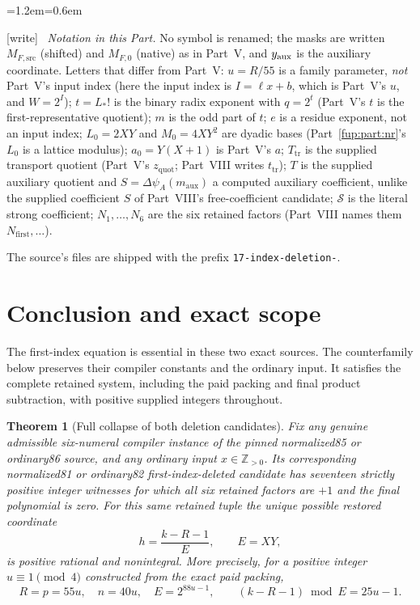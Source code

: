 \documentclass[11pt,letterpaper]{article}
\newtheorem{theorem}{Theorem}[section]
\theoremstyle{definition}\newtheorem{definition}[theorem]{Definition}
\theoremstyle{remark}\newtheorem{remark}[theorem]{Remark}
\newcommand{\Z}{\mathbb Z}\newcommand{\Np}{\mathbb Z_{>0}}
\newcommand{\MFsrcV}{M_{F,\mathrm{src}}}
\newcommand{\MFnatV}{M_{F,0}}
\newcommand{\zquot}{z_{\mathrm{quot}}}\newcommand{\ga}{g_a}
\newcommand{\tr}{T_{\mathrm{tr}}}\newcommand{\ma}{m_{\mathrm{aux}}}
\newcommand{\wtag}{\textup{[write]}}
\newenvironment{writenote}{\par\smallskip\begin{list}{}{\leftmargin=1.2em\rightmargin=0.6em}\item[]\small\wtag\ }{\end{list}\smallskip}
\begin{document}
\begin{writenote}
\emph{Notation in this Part.} No symbol is renamed; the masks are written $\MFsrcV$ (shifted) and $\MFnatV$ (native) as in Part~V, and $y_{\mathrm{aux}}$ is the auxiliary coordinate. Letters that differ from Part~V: $u=R/55$ is a family parameter, \emph{not} Part~V's input index (here the input index is $I=\ell x+b$, which is Part~V's $u$, and $W=2^I$); $t=L_*!$ is the binary radix exponent with $q=2^t$ (Part~V's $t$ is the first-representative quotient); $m$ is the odd part of $t$; $e$ is a residue exponent, not an input index; $L_0=2XY$ and $M_0=4XY^2$ are dyadic bases (Part~\ref{fup:part:nr}'s $L_0$ is a lattice modulus); $a_0=Y(X+1)$ is Part~V's $a$; $\tr$ is the supplied transport quotient (Part~V's $\zquot$; Part~VIII writes $t_{\mathrm{tr}}$); $T$ is the supplied auxiliary quotient and $S=\Delta\psi_A(\ma)$ a computed auxiliary coefficient, unlike the supplied coefficient $S$ of Part~VIII's free-coefficient candidate; $\mathcal S$ is the literal strong coefficient; $N_1,\ldots,N_6$ are the six retained factors (Part~VIII names them $N_{\mathrm{first}},\ldots$).

The source's files are shipped with the prefix \texttt{17-index-deletion-}.
\end{writenote}

\section{Conclusion and exact scope}\label{fup:fd:sec:scope}
The first-index equation is essential in these two exact sources. The counterfamily below preserves their compiler constants and the ordinary input. It satisfies the complete retained system, including the paid packing and final product subtraction, with positive supplied integers throughout.

\begin{theorem}[Full collapse of both deletion candidates]\label{fup:fd:thm:main}
Fix any genuine admissible six-numeral compiler instance of the pinned normalized85 or ordinary86 source, and any ordinary input $x\in\Z_{>0}$. Its corresponding normalized81 or ordinary82 first-index-deleted candidate has seventeen strictly positive integer witnesses for which all six retained factors are $+1$ and the final polynomial is zero. For this same retained tuple the unique possible restored coordinate
\[
 h=\frac{k-R-1}{E},\qquad E=XY,
\]
is positive rational and nonintegral. More precisely, for a positive integer $u\equiv1\pmod4$ constructed from the exact paid packing,
\[
 R=p=55u,\quad n=40u,\quad E=2^{88u-1},\qquad
 (k-R-1)\bmod E=25u-1.
\]
\end{theorem}
\end{document}
